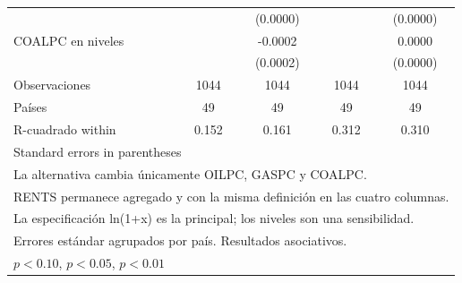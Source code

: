 \begin{table}[htbp]
\begin{tabular}{l*{4}{c}}
                    &                     &    (0.0000)         &                     &    (0.0000)         \\
\addlinespace
COALPC en niveles   &                     &     -0.0002         &                     &      0.0000         \\
                    &                     &    (0.0002)         &                     &    (0.0000)         \\
\midrule
Observaciones       &        1044         &        1044         &        1044         &        1044         \\
Países              &          49         &          49         &          49         &          49         \\
R-cuadrado within   &       0.152         &       0.161         &       0.312         &       0.310         \\
\bottomrule
\multicolumn{5}{l}{\footnotesize Standard errors in parentheses}\\
\multicolumn{5}{l}{\footnotesize La alternativa cambia únicamente OILPC, GASPC y COALPC.}\\
\multicolumn{5}{l}{\footnotesize RENTS permanece agregado y con la misma definición en las cuatro columnas.}\\
\multicolumn{5}{l}{\footnotesize La especificación ln(1+x) es la principal; los niveles son una sensibilidad.}\\
\multicolumn{5}{l}{\footnotesize Errores estándar agrupados por país. Resultados asociativos.}\\
\multicolumn{5}{l}{\footnotesize \sym{*} \(p<0.10\), \sym{**} \(p<0.05\), \sym{***} \(p<0.01\)}\\
\end{tabular}
\end{table}
